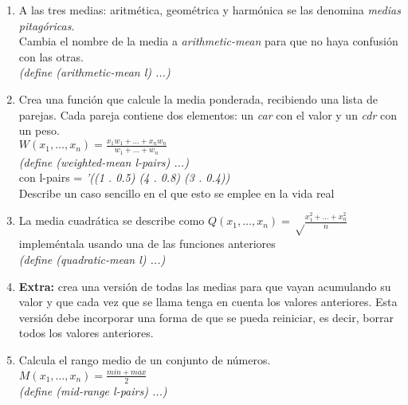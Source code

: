 \documentclass[11pt]{article}
\begin{document}
\begin{enumerate}
  \item A las tres medias: aritmética, geométrica y harmónica se las denomina \textit{medias pitagóricas}.
    \\[3mm]
    Cambia el nombre de la media a \textit{arithmetic-mean} para que no haya confusión con las otras.
    \\[3mm]
    \textit{(define (arithmetic-mean l) ...)}

  \item Crea una función que calcule la media ponderada, recibiendo una lista de parejas. Cada pareja contiene dos elementos: un \textit{car} con el valor y un \textit{cdr} con un peso.
    \\[3mm]
    {\Large
    $W(x_1,\dots,x_n) = \frac{x_1w_1 + \dots + x_nw_n}{w_1 + \dots + w_n}$
  }
    \\[3mm]
    \textit{(define (weighted-mean l-pairs) ...)}
    \\[3mm]
    con l-pairs = 
    \textit{'((1 . 0.5) (4 . 0.8) (3 . 0.4))}
    \\[3mm]
    Describe un caso sencillo en el que esto se emplee en la vida real

  \item La media cuadrática se describe como {\Large $Q(x_1,\dots,x_n) = \sqrt \frac{x_1^2 + \dots + x_n^2}{n}$ }
    impleméntala usando una de las funciones anteriores
    \\[3mm]
    \textit{(define (quadratic-mean l) ...)}

  \item \textbf{Extra:} crea una versión de todas las medias para que vayan acumulando su valor y que cada vez que se llama tenga en cuenta los valores anteriores. Esta versión debe incorporar una forma de que se pueda reiniciar, es decir, borrar todos los valores anteriores.

  \item Calcula el rango medio de un conjunto de números.
    \\[3mm]
    {\Large
    $M(x_1,\dots,x_n) = \frac{min + max}{2}$
  }
    \\[3mm]
    \textit{(define (mid-range l-pairs) ...)}
\end{enumerate}

\end{document}
